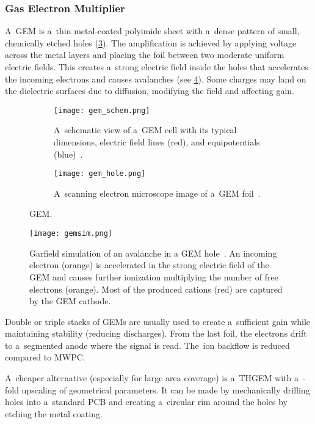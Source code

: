 			\subsubsection{Gas Electron Multiplier}
				A~\acf{GEM} is a~thin metal-coated polyimide sheet with a~dense pattern of small, chemically etched holes (\cref{fig:gem}). The amplification is achieved by applying voltage across the metal layers and placing the foil between two moderate uniform electric fields. This creates a~strong electric field inside the holes that accelerates the incoming electrons and causes avalanches (see \cref{fig:gemsim}). Some charges may land on the dielectric surfaces due to diffusion, modifying the field and affecting gain.
				
				\begin{figure}
					\centering
					\begin{subfigure}[t]{0.48\textwidth}
						\centering
						\texttt{[image: gem\_schem.png]}
						\caption{A~schematic view of a~\ac{GEM} cell with its typical dimensions, electric field lines (red), and equipotentials (blue)~\cite{pdg2024}.}
						\label{fig:gem_schem}
					\end{subfigure}
					\hfill
					\begin{subfigure}[t]{0.48\textwidth}
						\centering
						\texttt{[image: gem\_hole.png]}
						\caption{A~scanning electron microscope image of a~\ac{GEM} foil~\cite{gemhole}.}
						\label{fig:gemhole}
					\end{subfigure}
					\caption{\acf{GEM}.}
					\label{fig:gem}
				\end{figure}
				\begin{figure}
					\centering
					\texttt{[image: gemsim.png]}
					\caption{Garfield simulation of an avalanche in a \ac{GEM} hole~\cite{gemsim}. An incoming electron (orange) is accelerated in the strong electric field of the \ac{GEM} and causes further ionization multiplying the number of free electrons (orange). Most of the produced cations (red) are captured by the \ac{GEM} cathode.}
					\label{fig:gemsim}
				\end{figure}
				
				Double or triple stacks of \acp{GEM} are usually used to create a~sufficient gain while maintaining stability (reducing discharges). From the last foil, the electrons drift to a~segmented anode where the signal is read. The~ion backflow is reduced compared to \ac{MWPC}.
				
				A~cheaper alternative (especially for large area coverage) is a~\ac{THGEM} with a~\nobreakdash-fold upscaling of geometrical parameters. It can be made by mechanically drilling holes into a~standard \ac{PCB} and creating a~circular rim around the holes by etching the metal coating.
			
